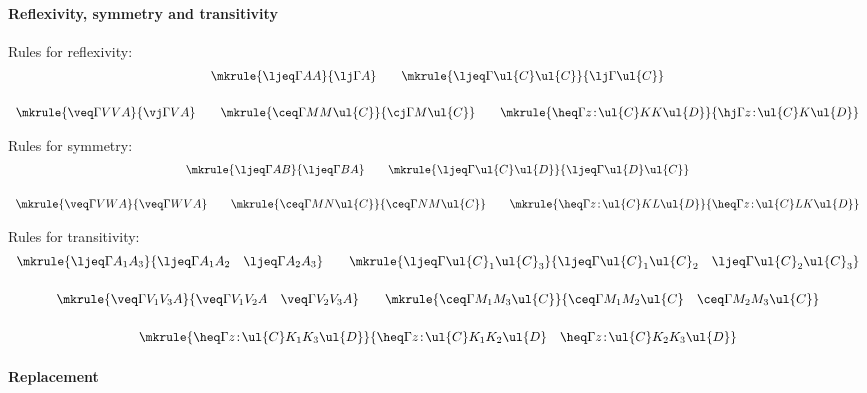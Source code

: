 \paragraph*{Reflexivity, symmetry and transitivity} \mbox{}

\noindent
Rules for reflexivity:
\vspace{0.15cm}
\[
\begin{array}{c}
\mkrule
{\ljeq \Gamma A A}
{\lj \Gamma A}
\qquad
\mkrule
{\ljeq \Gamma {\ul{C}} {\ul{C}}}
{\lj \Gamma {\ul{C}}}
\\[6mm]
\mkrule
{\veq \Gamma V V A}
{\vj \Gamma V A}
\qquad
\mkrule
{\ceq \Gamma M M {\ul{C}}}
{\cj \Gamma M {\ul{C}}}
\qquad
\mkrule
{\heq \Gamma {z \!:\! \ul{C}} K K {\ul{D}}}
{\hj \Gamma {z \!:\! \ul{C}} K {\ul{D}}}
\end{array}
\]

\noindent
Rules for symmetry:
\vspace{0.15cm}
\[
\begin{array}{c}
\mkrule
{\ljeq \Gamma A B}
{\ljeq \Gamma B A}
\qquad
\mkrule
{\ljeq \Gamma {\ul{C}} {\ul{D}}}
{\ljeq \Gamma {\ul{D}} {\ul{C}}}
\\[6mm]
\mkrule
{\veq \Gamma V W A}
{\veq \Gamma W V A}
\qquad
\mkrule
{\ceq \Gamma M N {\ul{C}}}
{\ceq \Gamma N M {\ul{C}}}
\qquad
\mkrule
{\heq \Gamma {z \!:\! \ul{C}} K L {\ul{D}}}
{\heq \Gamma {z \!:\! \ul{C}} L K {\ul{D}}}
\end{array}
\]

\noindent
Rules for transitivity:
\vspace{0.15cm}
\[
\begin{array}{c}
\mkrule
{\ljeq \Gamma {A_1} {A_3}}
{\ljeq \Gamma {A_1} {A_2} \quad \ljeq \Gamma {A_2} {A_3}}
\qquad
\mkrule
{\ljeq \Gamma {\ul{C}_1} {\ul{C}_3}}
{\ljeq \Gamma {\ul{C}_1} {\ul{C}_2} \quad \ljeq \Gamma {\ul{C}_2} {\ul{C}_3}}
\\[6mm]
\mkrule
{\veq \Gamma {V_1} {V_3} A}
{\veq \Gamma {V_1} {V_2} A \quad \veq \Gamma {V_2} {V_3} A}
\qquad
\mkrule
{\ceq \Gamma {M_1} {M_3} {\ul{C}}}
{\ceq \Gamma {M_1} {M_2} {\ul{C}} \quad \ceq \Gamma {M_2} {M_3} {\ul{C}}}
\\[6mm]
\mkrule
{\heq \Gamma {z \!:\! \ul{C}} {K_1} {K_3} {\ul{D}}}
{\heq \Gamma {z \!:\! \ul{C}} {K_1} {K_2} {\ul{D}} \quad \heq \Gamma {z \!:\! \ul{C}} {K_2} {K_3} {\ul{D}}}
\end{array}
\]

\paragraph*{Replacement} \mbox{}


